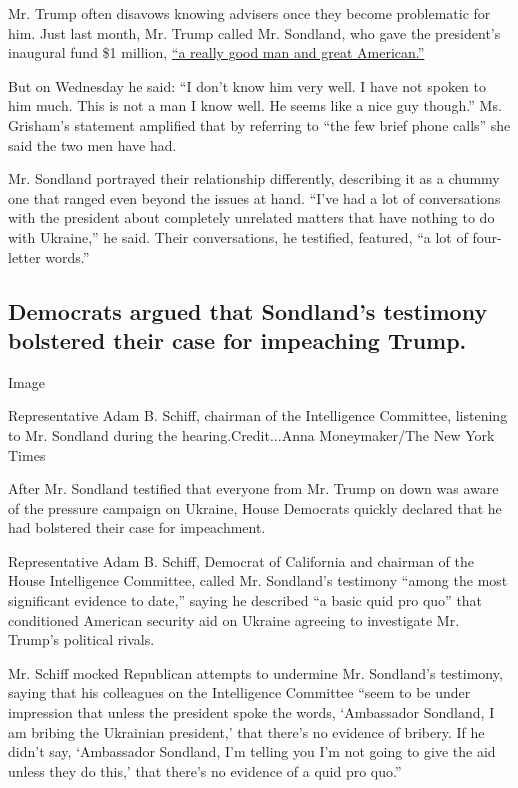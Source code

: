 Mr. Trump often disavows knowing advisers once they become problematic
for him. Just last month, Mr. Trump called Mr. Sondland, who gave the
president's inaugural fund \$1 million,
\href{https://twitter.com/realDonaldTrump/status/1181560708808486914?s=20}{``a
really good man and great American.''}

But on Wednesday he said: ``I don't know him very well. I have not
spoken to him much. This is not a man I know well. He seems like a nice
guy though.'' Ms. Grisham's statement amplified that by referring to
``the few brief phone calls'' she said the two men have had.

Mr. Sondland portrayed their relationship differently, describing it as
a chummy one that ranged even beyond the issues at hand. ``I've had a
lot of conversations with the president about completely unrelated
matters that have nothing to do with Ukraine,'' he said. Their
conversations, he testified, featured, ``a lot of four-letter words.''

\hypertarget{democrats-argued-that-sondlands-testimony-bolstered-their-case-for-impeaching-trump}{%
\subsection{Democrats argued that Sondland's testimony bolstered their
case for impeaching
Trump.}\label{democrats-argued-that-sondlands-testimony-bolstered-their-case-for-impeaching-trump}}

Image

Representative Adam B. Schiff, chairman of the Intelligence Committee,
listening to Mr. Sondland during the hearing.Credit...Anna
Moneymaker/The New York Times

After Mr. Sondland testified that everyone from Mr. Trump on down was
aware of the pressure campaign on Ukraine, House Democrats quickly
declared that he had bolstered their case for impeachment.

Representative Adam B. Schiff, Democrat of California and chairman of
the House Intelligence Committee, called Mr. Sondland's testimony
``among the most significant evidence to date,'' saying he described ``a
basic quid pro quo'' that conditioned American security aid on Ukraine
agreeing to investigate Mr. Trump's political rivals.

Mr. Schiff mocked Republican attempts to undermine Mr. Sondland's
testimony, saying that his colleagues on the Intelligence Committee
``seem to be under impression that unless the president spoke the words,
`Ambassador Sondland, I am bribing the Ukrainian president,' that
there's no evidence of bribery. If he didn't say, `Ambassador Sondland,
I'm telling you I'm not going to give the aid unless they do this,' that
there's no evidence of a quid pro quo.''


